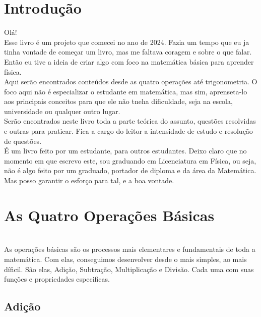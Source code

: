 \documentclass[a4paper, 12pt]{article}
\begin{document}
\maketitle

\section{Introdução}
Olá!\\

 Esse livro é um projeto que comecei no ano de 2024. Fazia um tempo que eu ja tinha vontade de começar um livro, mas me faltava coragem e sobre o que falar. Então eu tive a ideia de criar algo com foco na matemática básica para aprender física.\\
 
 Aqui serão encontrados conteúdos desde as quatro operações até trigonometria. O foco aqui não é especializar o estudante em matemática, mas sim, aprenseta-lo aos principais conceitos para que ele não tneha dificuldade, seja na escola, universidade ou qualquer outro lugar.\\

 Serão encontrados neste livro toda a parte teórica do assunto, questões resolvidas e outras para praticar. Fica a cargo do leitor a intensidade de estudo e resolução de questões.\\

  É um livro feito por um estudante, para outros estudantes. Deixo claro que no momento em que escrevo este, sou graduando em Licenciatura em Física, ou seja, não é algo feito por um graduado, portador de diploma e da área da Matemática. Mas posso garantir o esforço para tal, e a boa vontade. \\

\newpage
\tableofcontents
\newpage
\section{As Quatro Operações Básicas}
\\

 As operações básicas são os processos mais elementares e fundamentais de toda a matemática. Com elas, conseguimos desenvolver desde o mais simples, ao mais díficil. São elas, Adição, Subtração, Multiplicação e Divisão. Cada uma com suas funções e propriedades especificas.
\subsection{Adição}
\end{document}
